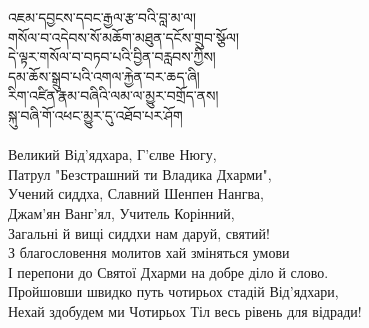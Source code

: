 འཇམ་དབྱངས་དབང་རྒྱལ་རྩ་བའི་བླ་མ་ལ།\\
གསོལ་བ་འདེབས་སོ་མཆོག་མཐུན་དངོས་གྲུབ་སྩོལ།\\
དེ་ལྟར་གསོལ་བ་བཏབ་པའི་བྱིན་བརླབས་ཀྱིས།\\
དམ་ཆོས་སྒྲུབ་པའི་འགལ་རྐྱེན་བར་ཆད་ཞི།\\
རིག་འཛིན་རྣམ་བཞིའི་ལམ་ལ་མྱུར་བགྲོད་ནས།\\
སྐུ་བཞི་གོ་འཕང་མྱུར་དུ་འཐོབ་པར་ཤོག\\
\\
\ru
Великий Від'ядхара, Г'єлве Нюгу,\\
Патрул "Безстрашний ти Владика Дхарми",\\
Учений сиддха, Славний Шенпен Нангва,\\
Джам'ян Ванг'ял, Учитель Корінний,\\
Загальні й вищі сиддхи нам даруй, святий!\\
З благословення молитов хай зміняться умови\\
І перепони до Святої Дхарми на добре діло й слово.\\
Пройшовши швидко путь чотирьох стадій Від'ядхари,\\
Нехай здобудем ми Чотирьох Тіл весь рівень для відради!\\
\\
\newpage
